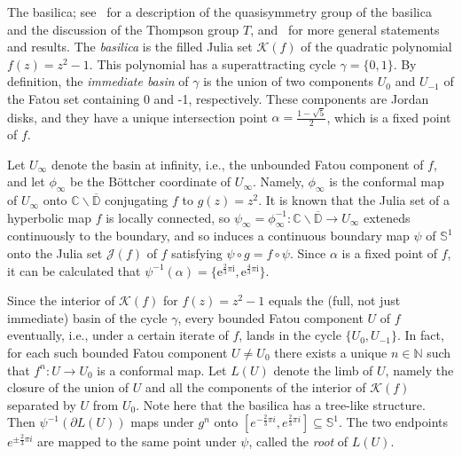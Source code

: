 \documentclass[12pt]{amsart}
\makeatletter
\newtheorem*{ex}{Example}
\newcommand{\C}{\mathbb{C}}
\newcommand{\D}{\mathbb{D}}
\newcommand{\N}{\mathbb{N}}
\newcommand{\sub}{\subseteq }
\newcommand{\J}{\mathcal{J}}
\newcommand{\co}{\colon}
\renewenvironment{ex}[1][\examplename]{%
  \par
  \pushQED{\qed}%
  \normalfont\topsep6\p@ \@plus6\p@ \trivlist
  \item[\hskip\labelsep\itshape
        \bfseries #1\@addpunct{:}]%
  \ignorespaces
}{%
  \popQED\endtrivlist
}
\renewenvironment{ex}{%
  \normalfont\topsep6\p@ \@plus6\p@ \trivlist
  \item[\hskip\labelsep\bfseries Example:]%
  \ignorespaces
}{%
  \endtrivlist
}
\makeatother
\begin{document}
\begin{ex} The basilica; see~\cite{LM} for a description of the quasisymmetry group of the basilica and the discussion of the Thompson group $T$, and~\cite{BF} for more general statements and results.
The \textit{basilica} is the filled Julia set $\mathcal{K}(f)$ of the quadratic polynomial $f(z)=z^2-1$.
This polynomial has a superattracting cycle $\gamma=\{0,1\}$. By definition, the \emph{immediate basin} of $\gamma$ is the union of two components $U_0$
and $U_{-1}$ of the Fatou set containing 0 and -1, respectively. These components are Jordan disks, and they have a unique intersection point 
$\alpha=\frac{1-\sqrt{5}}{2}$, which is a fixed point of $f$. 

Let $U_\infty$ denote the basin at infinity, i.e., the unbounded Fatou component of $f$, and let $\phi_\infty$ be the B\"ottcher coordinate
of $U_\infty$. Namely, $\phi_\infty$ is the conformal map of $U_\infty$ onto $\C\backslash \overline{\D}$ conjugating $f$ to $g(z)=z^2$.
It is known that the Julia set of a hyperbolic map $f$ is locally connected, so $\psi_\infty=\phi_\infty^{-1}\co \C\backslash \overline{\D}\to U_\infty$ exteneds continuously to 
the boundary, and so induces a continuous boundary map $\psi$ of $\mathbb{S}^1$ onto the Julia set $\J(f)$ of $f$ satisfying $\psi\circ g=f\circ \psi$.
Since $\alpha$ is a fixed point of $f$, it can be calculated that 
$\psi^{-1}(\alpha)=\{\mathrm{e}^{\frac{2}{3}\pi \mathrm{i}},\mathrm{e}^{\frac{4}{3}\pi \mathrm{i}}\}$. 

Since the interior of $\mathcal{K}(f)$ for $f(z)=z^2-1$ equals the (full, not just immediate) basin of the cycle $\gamma$, every bounded Fatou component $U$ of $f$ eventually, i.e., under a certain iterate of $f$, lands in the cycle $\{U_0, U_{-1}\}$. 
In fact, for each such bounded Fatou component $U\neq U_0$ there exists a unique $n\in\N$ such that $f^n\co U\to U_0$ is a conformal map. Let $L(U)$ denote the limb of $U$, namely the closure of the union of $U$ and all the components of the interior of $\mathcal{K}(f)$ separated by $U$ from $U_0$. Note here that the ba\-si\-li\-ca has a tree-like structure.  Then $\psi^{-1}(\partial L(U))$ maps under $g^n$ onto 
$[{e}^{-\frac{2}{3}\pi {i}}, {e}^{\frac{2}{3}\pi {i}}]\sub \mathbb{S}^1$. The two endpoints ${e}^{\pm\frac{2}{3}\pi {i}}$ are mapped to the same point under $\psi$, called the \emph{root} of $L(U)$. 


\end{ex}
\end{document}
